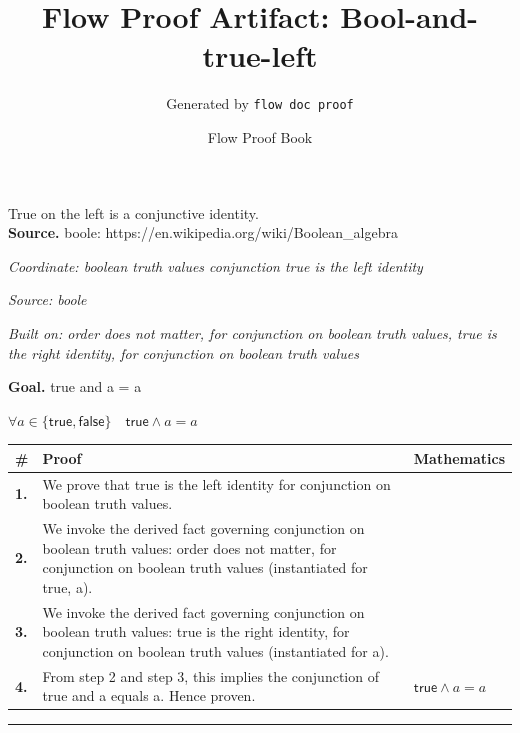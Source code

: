 \documentclass[11pt]{article}
\title{Flow Proof Artifact: Bool-and-true-left}
\author{Generated by \texttt{flow doc proof}}
\date{Flow Proof Book}
\theoremstyle{definition}
\begin{document}
\maketitle
True on the left is a conjunctive identity.\\[0.5em]
\textbf{Source.} boole: https://en.wikipedia.org/wiki/Boolean\_algebra\\[0.5em]
\bigskip
{}\par
\smallskip\noindent\textit{Coordinate: boolean truth values \cdot conjunction \cdot true is the left identity}\par
\smallskip\noindent\textit{Source: boole}\par
\smallskip\noindent\textit{Built on: order does not matter, for conjunction on boolean truth values, true is the right identity, for conjunction on boolean truth values}\par
\medskip
\noindent\textbf{Goal.} true and a = a\par
\noindent$\displaystyle \forall a \in \{\mathsf{true}, \mathsf{false}\}\quad \mathsf{true} \land a = a$\par
\medskip
\noindent
\begin{tabular}{@{} >{\raggedright\arraybackslash}p{} >{\raggedright\arraybackslash}p{} >{\raggedleft\arraybackslash}p{} @{}}
\textbf{\#} & \textbf{Proof} & \textbf{Mathematics} \\
\midrule
\textbf{1.} & We prove that true is the left identity for conjunction on boolean truth values. & \\[0.45em]
\textbf{2.} & We invoke the derived fact governing conjunction on boolean truth values: order does not matter, for conjunction on boolean truth values (instantiated for true, a). & \\[0.45em]
\textbf{3.} & We invoke the derived fact governing conjunction on boolean truth values: true is the right identity, for conjunction on boolean truth values (instantiated for a). & \\[0.45em]
\textbf{4.} & From step 2 and step 3, this implies the conjunction of true and a equals a. Hence proven. & $\displaystyle \mathsf{true} \land a = a$ \\[0.45em]
\bottomrule
\end{tabular}
\label{thm:Bool-conjunction-true_is_the_left_identity}
\par\medskip\hrule
\end{document}
